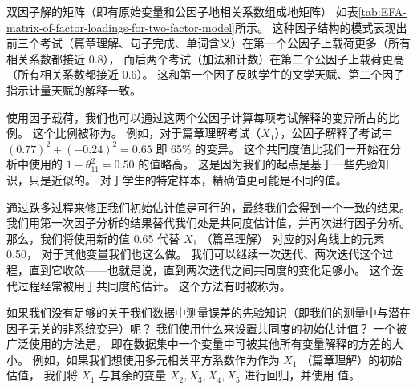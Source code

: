 双因子解的矩阵（即有原始变量和公因子地相关系数组成地矩阵）
如表\ref{tab:EFA-matrix-of-factor-loadings-for-two-factor-model}所示。
这种因子结构的模式表现出前三个考试（篇章理解、句子完成、单词含义）在第一个公因子上载荷更多（所有相关系数都接近 0.8），
而后两个考试（加法和计数）在第二个公因子上载荷更高（所有相关系数都接近 0.6）。
这和第一个因子反映学生的文学天赋、第二个因子指示计量天赋的解释一致。


\begin{table}
    \centering
\end{table}

使用因子载荷，我们也可以通过这两个公因子计算每项考试解释的变异所占的比例。
这个比例被称为。
例如，对于篇章理解考试（$ X_1 $），公因子解释了考试中 $ (0.77)^2 + (-0.24)^2 = 0.65 $ 即 65\% 的变异。
这个共同度值比我们一开始在分析中使用的 $ 1 - \theta_{11}^2 = 0.50 $ 的值略高。
这是因为我们的起点是基于一些先验知识，只是近似的。
对于学生的特定样本，精确值更可能是不同的值。

通过跌多过程来修正我们初始估计值是可行的，最终我们会得到一个一致的结果。
我们用第一次因子分析的结果替代我们处是共同度估计值，并再次进行因子分析。
那么，我们将使用新的值 0.65 代替 $ X_1 $ （篇章理解） 对应的对角线上的元素 0.50，
对于其他变量我们也这么做。
我们可以继续一次迭代、两次迭代这个过程，直到它收敛——也就是说，直到两次迭代之间共同度的变化足够小。
这个迭代过程经常被用于共同度的估计。
这个方法有时被称为。

如果我们没有足够的关于我们数据中测量误差的先验知识（即我们的测量中与潜在因子无关的非系统变异）呢？
我们使用什么来设置共同度的初始估计值？
一个被广泛使用的方法是，
即在数据集中一个变量中可被其他所有变量解释的方差的大小。
例如，如果我们想使用多元相关平方系数作为作为 $ X_1 $ （篇章理解）的初始估值，
我们将 $ X_1 $ 与其余的变量 $ X_2, X_3, X_4, X_5 $ 进行回归，并使用 \rsquare 值。

